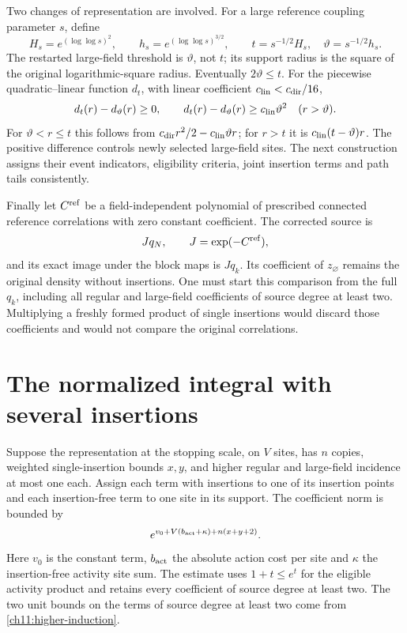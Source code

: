 Two changes of representation are involved. For a large reference coupling parameter
$s$, define
\[
 H_s=e^{(\log\log s)^2},\qquad h_s=e^{(\log\log s)^{3/2}},\qquad
 t=s^{-1/2}H_s,\quad \vartheta=s^{-1/2}h_s .
\]
The restarted large-field threshold is $\vartheta$, not $t$; its
support radius is the square of the original logarithmic-square radius.
Eventually $2\vartheta\le t$. For the piecewise quadratic--linear function
$d_t$, with linear coefficient $c_{\rm lin}<c_{\rm dir}/16$,
\[
 d_t(r)-d_\vartheta(r)\ge0,\qquad
 d_t(r)-d_\vartheta(r)\ge c_{\rm lin}\vartheta^2
                      \quad(r>\vartheta).
\]
For $\vartheta<r\le t$ this follows from
$c_{\rm dir}r^2/2-c_{\rm lin}\vartheta r$; for $r>t$ it is
$c_{\rm lin}(t-\vartheta)r$.
The positive difference controls newly selected large-field sites.
The next construction assigns their event indicators, eligibility criteria, joint
insertion terms and path tails consistently.



Finally let $C^{\rm ref}$ be a field-independent polynomial of prescribed
connected reference correlations with zero constant coefficient.
The corrected source is
\[
 Jq_N,\qquad J=\exp(-C^{\rm ref}),
\]
and its exact image under the block maps is $Jq_k$. Its coefficient of $z_\varnothing$ remains the
original density without insertions. One must start this comparison from the
full $q_k$, including all regular and large-field coefficients of source degree at least two.
Multiplying a freshly formed product of single insertions would
discard those coefficients and would not compare the original correlations.

\section{The normalized integral with several insertions}
\label{ch11:replicated}
Suppose the representation at the stopping scale, on $V$ sites, has $n$ copies,
weighted single-insertion bounds $x,y$, and higher regular and large-field
incidence at most one each. Assign each term with insertions to one of its
insertion points and each insertion-free term to one site in its support. The
coefficient norm is bounded by
\[
 e^{v_0+V(b_{\rm act}+\kappa)+n(x+y+2)}.
\]
Here $v_0$ is the constant term, $b_{\rm act}$ the absolute action cost per
site and $\kappa$ the insertion-free activity site sum. The estimate uses
$1+t\le e^t$ for the eligible activity product and retains every
coefficient of source degree at least two. The two unit bounds on the terms of source degree at least two come from
\eqref{ch11:higher-induction}.

